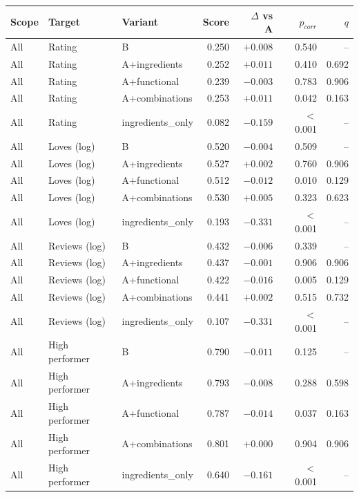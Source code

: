 \begin{table}[htbp]
\centering
\small
\begin{tabular}{|l|l|l|r|r|r|r|}
\hline
\rowcolor{headfill} \textbf{Scope} & \textbf{Target} & \textbf{Variant} & \textbf{Score} & \textbf{$\Delta$ vs A} & \textbf{$p_{corr}$} & \textbf{$q$} \\
\hline
All & Rating & B & 0.250 & $+0.008$ & 0.540 & -- \\
\hline
All & Rating & A+ingredients & 0.252 & $+0.011$ & 0.410 & 0.692 \\
\hline
All & Rating & A+functional & 0.239 & $-0.003$ & 0.783 & 0.906 \\
\hline
All & Rating & A+combinations & 0.253 & $+0.011$ & 0.042 & 0.163 \\
\hline
All & Rating & ingredients\_only & 0.082 & $-0.159$ & $<$0.001 & -- \\
\hline
\hline
All & Loves (log) & B & 0.520 & $-0.004$ & 0.509 & -- \\
\hline
All & Loves (log) & A+ingredients & 0.527 & $+0.002$ & 0.760 & 0.906 \\
\hline
All & Loves (log) & A+functional & 0.512 & $-0.012$ & 0.010 & 0.129 \\
\hline
All & Loves (log) & A+combinations & 0.530 & $+0.005$ & 0.323 & 0.623 \\
\hline
All & Loves (log) & ingredients\_only & 0.193 & $-0.331$ & $<$0.001 & -- \\
\hline
\hline
All & Reviews (log) & B & 0.432 & $-0.006$ & 0.339 & -- \\
\hline
All & Reviews (log) & A+ingredients & 0.437 & $-0.001$ & 0.906 & 0.906 \\
\hline
All & Reviews (log) & A+functional & 0.422 & $-0.016$ & 0.005 & 0.129 \\
\hline
All & Reviews (log) & A+combinations & 0.441 & $+0.002$ & 0.515 & 0.732 \\
\hline
All & Reviews (log) & ingredients\_only & 0.107 & $-0.331$ & $<$0.001 & -- \\
\hline
\hline
All & High performer & B & 0.790 & $-0.011$ & 0.125 & -- \\
\hline
All & High performer & A+ingredients & 0.793 & $-0.008$ & 0.288 & 0.598 \\
\hline
All & High performer & A+functional & 0.787 & $-0.014$ & 0.037 & 0.163 \\
\hline
All & High performer & A+combinations & 0.801 & $+0.000$ & 0.904 & 0.906 \\
\hline
All & High performer & ingredients\_only & 0.640 & $-0.161$ & $<$0.001 & -- \\

\end{tabular}
\end{table}
